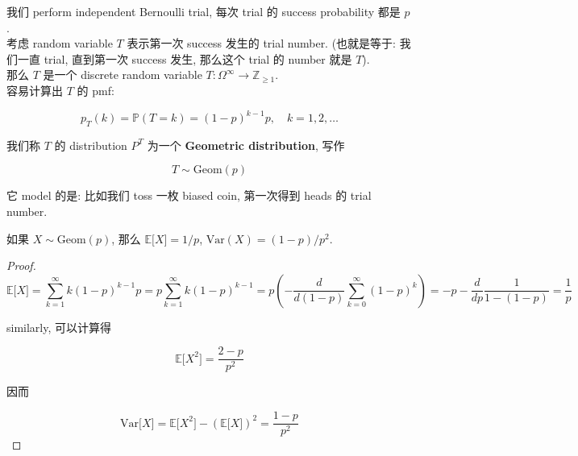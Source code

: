 \begin{example}

我们 perform independent Bernoulli trial, 每次 trial 的 success probability 都是 \(\mathit{p}\).\\
考虑 random variable \(\mathit{T}\) 表示第一次 success 发生的 trial number. (也就是等于: 我们一直 trial, 直到第一次 success 发生, 那么这个 trial 的 number 就是 \(\mathit{T}\)).\\
那么 \(\mathit{T}\) 是一个 discrete random variable \(\mathit{T}:\Omega^{\infty}\rightarrow\mathbb{Z}_{\geq 1}\).\\
容易计算出 \(\mathit{T}\) 的 pmf:

\[\mathit{p}_{\mathit{T}}(\mathit{k}) = \mathbb{P}(\mathit{T} = \mathit{k}) = (1 - \mathit{p})^{\mathit{k} - 1}\mathit{p},\quad\mathit{k} = 1,2,\ldots\]

我们称 \(\mathit{T}\) 的 distribution \(\mathit{P}^{\mathit{T}}\) 为一个 \textbf{Geometric distribution}, 写作

\[\mathit{T} \sim \text{Geom}(\mathit{p})\]

它 model 的是: 比如我们 toss 一枚 biased coin, 第一次得到 heads 的 trial number.\\

\end{example}

\begin{proposition}

如果 \(\mathit{X} \sim \text{Geom}(\mathit{p})\), 那么 \(\mathbb{E}\lbrack\mathit{X}\rbrack = 1/\mathit{p}\), \(\text{Var}(\mathit{X}) = (1 - \mathit{p})/\mathit{p}^{2}\).

\end{proposition}

\begin{proof}

\[\mathbb{E}\lbrack\mathit{X}\rbrack = \sum\limits_{\mathit{k} = 1}^{\infty}\mathit{k}(1 - \mathit{p})^{\mathit{k} - 1}\mathit{p} = \mathit{p}\sum\limits_{\mathit{k} = 1}^{\infty}\mathit{k}(1 - \mathit{p})^{\mathit{k} - 1} = \mathit{p}( - \frac{\mathit{d}}{\mathit{d}(1 - \mathit{p})}\sum\limits_{\mathit{k} = 0}^{\infty}(1 - \mathit{p})^{\mathit{k}}) = - \mathit{p} - \frac{\mathit{d}}{\mathit{d}\mathit{p}}\frac{1}{1 - (1 - \mathit{p})} = \frac{1}{\mathit{p}}\]

similarly, 可以计算得

\[\mathbb{E}\lbrack\mathit{X}^{2}\rbrack = \frac{2 - \mathit{p}}{\mathit{p}^{2}}\]

因而

\[\text{Var}\lbrack\mathit{X}\rbrack = \mathbb{E}\lbrack\mathit{X}^{2}\rbrack - (\mathbb{E}\lbrack\mathit{X}\rbrack)^{2} = \frac{1 - \mathit{p}}{\mathit{p}^{2}}\]

\end{proof}

